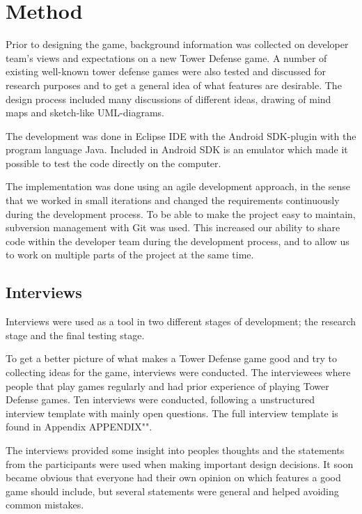 \chapter{Method}

Prior to designing the game, background information was collected on developer team's views and expectations on a new Tower Defense game. A number of existing well-known tower defense games were also tested and discussed for research purposes and to get a general idea of what features are desirable. The design process included many discussions of different ideas, drawing of mind maps and sketch-like UML-diagrams.

The development was done in Eclipse IDE with the Android SDK-plugin with the program language Java. Included in Android SDK is an emulator which made it possible to test the code directly on the computer.

The implementation was done using an agile development approach, in the sense that we worked in small iterations and changed the requirements continuously during the development process. To be able to make the project easy to maintain, subversion management with Git was used. This increased our ability to share code within the developer team during the development process, and to allow us to work on multiple parts of the project at the same time. 

\section{Interviews}

Interviews were used as a tool in two different stages of development; the research stage and the final testing stage.

To get a better picture of what makes a Tower Defense game good and try to collecting ideas for the game, interviews were conducted. The interviewees where people that play games regularly and had prior experience of playing Tower Defense games. Ten interviews were conducted, following a unstructured interview template with mainly open questions. The full interview template is found in Appendix APPENDIX"". 

The interviews provided some insight into peoples thoughts and the statements from the participants were used when making important design decisions. It soon became obvious that everyone had their own opinion on which features a good game should include, but several statements were general and helped avoiding common mistakes. 
